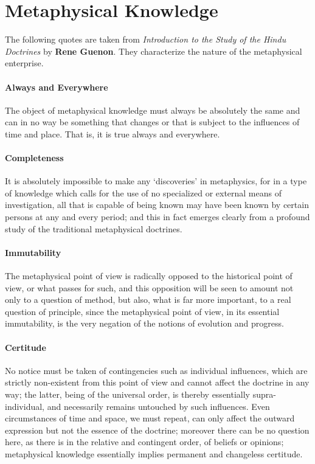 \section{Metaphysical Knowledge}

The following quotes are taken from \textit{Introduction to the Study of the Hindu Doctrines} by \textbf{Rene Guenon}. They characterize the nature of the metaphysical enterprise.

\paragraph{Always and Everywhere}


The object of metaphysical knowledge must always be absolutely the same and can in no way be something that changes or that is subject to the influences of time and place. That is, it is true always and everywhere. 

\paragraph{Completeness}


It is absolutely impossible to make any `discoveries' in metaphysics, for in a type of knowledge which calls for the use of no specialized or external means of investigation, all that is capable of being known may have been known by certain persons at any and every period; and this in fact emerges clearly from a profound study of the traditional metaphysical doctrines.

\paragraph{Immutability}


The metaphysical point of view is radically opposed to the historical point of view, or what passes for such, and this opposition will be seen to amount not only to a question of method, but also, what is far more important, to a real question of principle, since the metaphysical point of view, in its essential immutability, is the very negation of the notions of evolution and progress.

\paragraph{Certitude}


No notice must be taken of contingencies such as individual influences, which are strictly non-existent from this point of view and cannot affect the doctrine in any way; the latter, being of the universal order, is thereby essentially supra-individual, and necessarily remains untouched by such influences. Even circumstances of time and space, we must repeat, can only affect the outward expression but not the essence of the doctrine; moreover there can be no question here, as there is in the relative and contingent order, of beliefs or opinions; metaphysical knowledge essentially implies permanent and changeless certitude.

